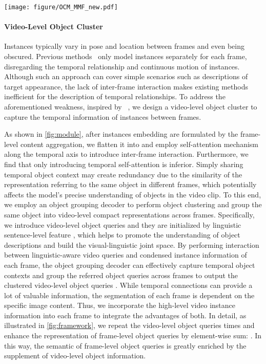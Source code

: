 \documentclass{article}
\begin{document}
\begin{figure*}
    \centering
    \texttt{[image: figure/OCM\_MMF\_new.pdf]}
    \vspace{-10pt}
    \caption{The structure of proposed  Multi-Modal Fusion module (MMF) and Video-level Object Cluster module (VOC).}
    \label{fig:module}
    \vspace{-10pt}
\end{figure*}

\vspace{-5pt}
\paragraph{Video-Level Object Cluster}\label{par:voc}
Instances typically vary in pose and location between frames and even being obscured. Previous methods~\cite{mttr, vlt, lbdt, referformer} only model instances separately for each frame, disregarding the temporal relationship and continuous motion of instances. Although such an approach can cover simple scenarios such as descriptions of target appearance, the lack of inter-frame interaction makes existing methods inefficient for the description of temporal relationships.
To address the aforementioned weakness, inspired by ~\cite{sstvos, vita, videoknet}, we design a video-level object cluster to capture the temporal information of instances between frames.

As shown in \cref{fig:module}, after instances embedding  are formulated by the frame-level content aggregation, we flatten it into  and employ self-attention mechanism along the temporal axis to introduce inter-frame interaction.
Furthermore, we find that only introducing temporal self-attention is inferior.
Simply sharing temporal object context may create redundancy due to the similarity of the representation referring to the same object in different frames, which potentially affects the model's precise understanding of objects in the video clip.
To this end, we employ an object grouping decoder to perform object clustering and group the same object into video-level compact representations across frames.
Specifically, we introduce  video-level object queries  and they are initialized by linguistic sentence-level feature , which helps to promote the understanding of object descriptions and build the visual-linguistic joint space.
By performing interaction between linguistic-aware video queries and condensed instance information of each frame, the object grouping decoder can effectively capture temporal object contexts and group the referred object queries across frames to output the clustered video-level object queries . 
While temporal connections can provide a lot of valuable information, the segmentation of each frame is dependent on the specific image content.
Thus, we incorporate the high-level video instance information into each frame to integrate the advantages of both.
In detail, as illustrated in \cref{fig:framework}, we repeat the video-level object queries  times  and enhance the representation of frame-level object queries by element-wise sum: . In this way, the semantic of frame-level object queries is greatly enriched by the supplement of video-level object information.
\end{document}
